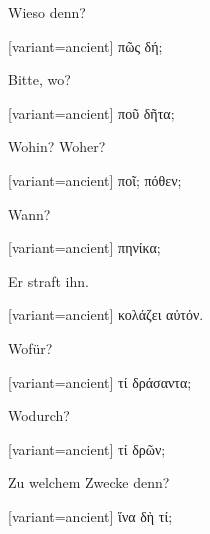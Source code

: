 Wieso denn?

\switchcolumn

\begin{greek}[variant=ancient]%
πῶς δή;

\end{greek}%
\switchcolumn*

Bitte, wo?

\switchcolumn

\begin{greek}[variant=ancient]%
ποῦ δῆτα;

\end{greek}%
\switchcolumn*

Wohin? Woher?

\switchcolumn

\begin{greek}[variant=ancient]%
ποῖ; πόθεν;

\end{greek}%
\switchcolumn*

Wann?

\switchcolumn

\begin{greek}[variant=ancient]%
πηνίκα;

\end{greek}%
\switchcolumn*

Er straft ihn.

\switchcolumn

\begin{greek}[variant=ancient]%
κολάζει αὐτόν.

\end{greek}%
\switchcolumn*

Wofür?

\switchcolumn

\begin{greek}[variant=ancient]%
τί δράσαντα;

\end{greek}%
\switchcolumn*

Wodurch?

\switchcolumn

\begin{greek}[variant=ancient]%
τί δρῶν;

\end{greek}%
\switchcolumn*

Zu welchem Zwecke denn?

\switchcolumn

\begin{greek}[variant=ancient]%
ἵνα δὴ τί;

\end{greek}%
\switchcolumn*

